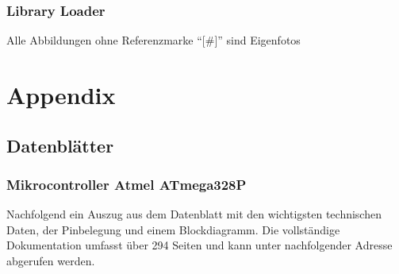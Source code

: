 \documentclass[a4paper, twoside, 12pt, openright]{memoir}
\newcommand{\AndreasGrain}{Andreas Grain}
\newcommand{\MatthiasMair}{Matthias Mair}
\newcommand{\authorName}{\AndreasGrain\ / \MatthiasMair}
\begin{document}
\section{Library Loader}


\cleartoverso

\renewcommand{\authorName}{\AndreasGrain\ / \MatthiasMair}
\appendix
\printbibliography[title={Literatur und Quellen}]\clearpage
\printacronyms[heading=chapter*,name=Abkürzungen]\clearpage
\listoffigures
Alle Abbildungen ohne Referenzmarke \enquote{[\#]} sind Eigenfotos\clearpage
\listoftables\clearpage

\part{Appendix}
\chapter{Datenblätter}
\section{Mikrocontroller Atmel ATmega328P}
Nachfolgend ein Auszug aus dem Datenblatt mit den wichtigsten technischen Daten, der Pinbelegung und einem Blockdiagramm. Die vollständige Dokumentation umfasst über 294 Seiten und kann unter nachfolgender Adresse abgerufen werden.\par
{}
\end{document}
